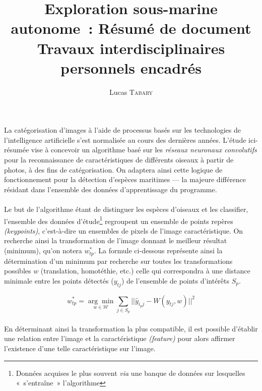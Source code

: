 \documentclass{article}
\title{Exploration sous-marine autonome~: Résumé de document\\ \normalsize Travaux interdisciplinaires personnels encadrés}
\author{Lucas \textsc{Tabary}}
\date{}
\begin{document}
\maketitle
\thispagestyle{fancy}

\paragraph{} La catégorisation d'images à l'aide de processus basés sur les technologies de l'intelligence artificielle s'est normalisée au cours des dernières années. L'étude ici-résumée vise à concevoir un algorithme basé sur les \textit{réseaux neuronaux convolutifs} pour la reconnaissance de caractéristiques de différents oiseaux à partir de photos, à des fins de catégorisation. On adaptera ainsi cette logique de fonctionnement pour la détection d'espèces maritimes --- la majeure différence résidant dans l'ensemble des données d'apprentissage du programme.

\paragraph{} Le but de l'algorithme étant de distinguer les espèces d'oiseaux et les classifier, l'ensemble des données d'étude\footnote{Données acquises le plus souvent \textit{via} une banque de données sur lesquelles «~s'entraîne~» l'algorithme} regroupent un ensemble de points repères \textit{(keypoints)}, c'est-à-dire un ensembles de pixels de l'image caractéristique. On recherche ainsi la transformation de l'image donnant le meilleur résultat (minimum), qu'on notera $w^*_{tp}$. La formule ci-dessous représente ainsi la détermination d'un minimum par recherche sur toutes les transformations possibles $w$ (translation, homotéthie, etc.) celle qui correspondra à une distance minimale entre les points détectés ($y_{tj}$) de l'ensemble de points d'intérêts $S_p$.

\begin{displaymath}
    w^*_{tp} = \underset{w\in\mathcal{W}}{\arg\min} \sum_{j\in S_p} || \hat{y}_{i_pj} - W(y_{tj},w) ||^2
\end{displaymath}

\paragraph{} En déterminant ainsi la transformation la plus compatible, il est possible d'établir une relation entre l'image et la caractéristique \textit{(feature)} pour alors affirmer l'existence d'une telle caractéristique sur l'image.
\end{document}
